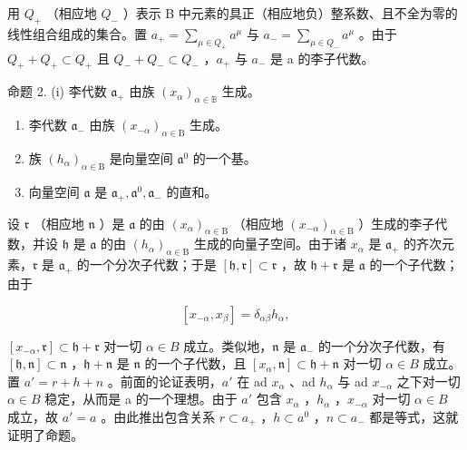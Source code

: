 用 \(Q_{+}\) （相应地 \(Q_{-}\) ）表示 B 中元素的具正（相应地负）整系数、且不全为零的线性组合组成的集合。置 \(a_{+} = \sum_{\mu \in Q_{+}} a^{\mu}\) 与 \(a_{-} = \sum_{\mu \in Q_{-}} a^{\mu}\) 。由于 \(Q_{+} + Q_{+} \subset Q_{+}\) 且 \(Q_{-} + Q_{-} \subset Q_{-}\) ，\(a_{+}\) 与 \(a_{-}\) 是 a 的李子代数。

命题 2. (i) 李代数 \(\mathfrak{a}_{+}\) 由族 \((x_{\alpha})_{\alpha \in \mathbb{B}}\) 生成。

\begin{enumerate}
\def\labelenumi{(\roman{enumi})}
\setcounter{enumi}{1}
\item
  李代数 \(\mathfrak{a}_{-}\) 由族 \((x_{-\alpha})_{\alpha \in \mathrm{B}}\) 生成。
\item
  族 \((h_{\alpha})_{\alpha \in \mathrm{B}}\) 是向量空间 \(\mathfrak{a}^0\) 的一个基。
\item
  向量空间 \(\mathfrak{a}\) 是 \(\mathfrak{a}_{+},\mathfrak{a}^{0},\mathfrak{a}_{-}\) 的直和。
\end{enumerate}

设 \(\mathfrak{r}\) （相应地 \(\mathfrak{n}\) ）是 \(\mathfrak{a}\) 的由 \((x_{\alpha})_{\alpha \in \mathrm{B}}\) （相应地 \((x_{-\alpha})_{\alpha \in \mathrm{B}}\) ）生成的李子代数，并设 \(\mathfrak{h}\) 是 \(\mathfrak{a}\) 的由 \((h_{\alpha})_{\alpha \in \mathrm{B}}\) 生成的向量子空间。由于诸 \(x_{\alpha}\) 是 \(\mathfrak{a}_{+}\) 的齐次元素，\(\mathfrak{r}\) 是 \(\mathfrak{a}_{+}\) 的一个分次子代数；于是 \([\mathfrak{h},\mathfrak{r}]\subset \mathfrak{r}\) ，故 \(\mathfrak{h} + \mathfrak{r}\) 是 \(\mathfrak{a}\) 的一个子代数；由于

\[
[ x _ {- \alpha}, x _ {\beta} ] = \delta_ {\alpha \beta} h _ {\alpha},
\]

\([x_{-\alpha}, \mathfrak{r}] \subset \mathfrak{h} + \mathfrak{r}\) 对一切 \(\alpha \in B\) 成立。类似地，\(\mathfrak{n}\) 是 \(\mathfrak{a}_{-}\) 的一个分次子代数，有 \([\mathfrak{h}, \mathfrak{n}] \subset \mathfrak{n}\) ，\(\mathfrak{h} + \mathfrak{n}\) 是 \(\mathfrak{n}\) 的一个子代数，且 \([x_{\alpha}, \mathfrak{n}] \subset \mathfrak{h} + \mathfrak{n}\) 对一切 \(\alpha \in B\) 成立。置 \(a' = r + h + n\) 。前面的论证表明，\(a'\) 在 ad \(x_{\alpha}\) 、ad \(h_{\alpha}\) 与 ad \(x_{-\alpha}\) 之下对一切 \(\alpha \in B\) 稳定，从而是 a 的一个理想。由于 \(a'\) 包含 \(x_{\alpha}\) ，\(h_{\alpha}\) ，\(x_{-\alpha}\) 对一切 \(\alpha \in B\) 成立，故 \(a' = a\) 。由此推出包含关系 \(r \subset a_{+}\) ，\(h \subset a^{0}\) ，\(n \subset a_{-}\) 都是等式，这就证明了命题。

